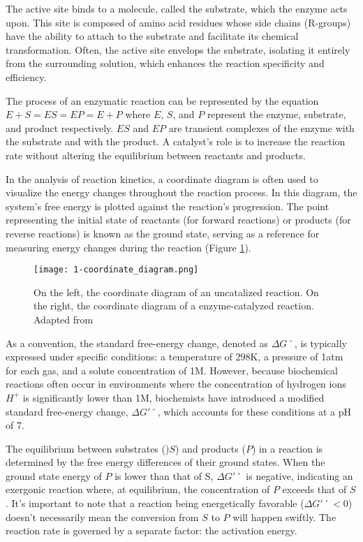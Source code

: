The active site binds to a molecule, called the substrate, which the enzyme acts upon. This site is composed of amino acid residues whose side chains (R-groups) have the ability to attach to the substrate and facilitate its chemical transformation. Often, the active site envelops the substrate, isolating it entirely from the surrounding solution, which enhances the reaction specificity and efficiency.

The process of an enzymatic reaction can be represented by the equation $E+S=ES=EP=E+P$ where $E$, $S$, and $P$ represent the enzyme, substrate, and product respectively. $ES$ and $EP$ are transient complexes of the enzyme with the substrate and with the product. A catalyst's role is to increase the reaction rate without altering the equilibrium between reactants and products.

In the analysis of reaction kinetics, a coordinate diagram is often used to visualize the energy changes throughout the reaction process. In this diagram, the system's free energy is plotted against the reaction's progression. The point representing the initial state of reactants (for forward reactions) or products (for reverse reactions) is known as the ground state, serving as a reference for measuring energy changes during the reaction (Figure \ref{fig:coordinate_diagram}).

\begin{figure}
  \centering
  \texttt{[image: 1-coordinate\_diagram.png]}
  \caption{On the left, the coordinate diagram of an uncatalized reaction. On the right, the coordinate diagram of a enzyme-catalyzed reaction. Adapted from \citeauthor{lehninger}}
  \label{fig:coordinate_diagram}
\end{figure}

As a convention, the standard free-energy change, denoted as $\Delta G˚$, is typically expressed under specific conditions: a temperature of 298K, a pressure of 1atm for each gas, and a solute concentration of 1M. However, because biochemical reactions often occur in environments where the concentration of hydrogen ions $H^+$ is significantly lower than 1M, biochemists have introduced a modified standard free-energy change, $\Delta G'˚$, which accounts for these conditions at a pH of 7.

The equilibrium between substrates ()$S$) and products ($P$) in a reaction is determined by the free energy differences of their ground states. When the ground state energy of $P$ is lower than that of S, $\Delta G'˚$ is negative, indicating an exergonic reaction where, at equilibrium, the concentration of $P$ exceeds that of $S$. It's important to note that a reaction being energetically favorable ($\Delta G'˚<0$) doesn't necessarily mean the conversion from $S$ to $P$ will happen swiftly. The reaction rate is governed by a separate factor: the activation energy.

